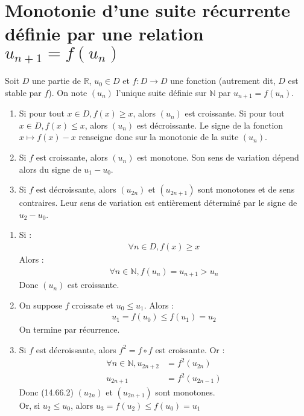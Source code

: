 \documentclass[../main.tex]{subfiles}
\begin{document}
\section{Monotonie d'une suite récurrente définie par une relation $u_{n+1} = f(u_n)$}
\begin{tcolorbox}[title=Théorème 14.66, title filled=false, colframe=orange, colback=orange!10!white]
    Soit $D$ une partie de $\mathbb{R}$, $u_0 \in D$ et $f:D\to D$ une fonction (autrement dit, $D$ est stable par $f$). On note $(u_n)$ l'unique suite définie sur $\mathbb{N}$ par $u_{n+1} = f(u_n)$. 
    \begin{enumerate}
        \item Si pour tout $x \in D, f(x) \geq x$, alors $(u_n)$ est croissante. Si pour tout $x \in D, f(x) \leq x$, alors $(u_n)$ est décroissante. Le signe de la fonction $x \mapsto f(x) - x$ renseigne donc sur la monotonie de la suite $(u_n)$. 
        \item Si $f$ est croissante, alors $(u_n)$ est monotone. Son sens de variation dépend alors du signe de $u_1 - u_0$. 
        \item Si $f$ est décroissante, alors $(u_{2n})$ et $(u_{2n+1})$ sont monotones et de sens contraires. Leur sens de variation est entièrement déterminé par le signe de $u_2 - u_0$. 
    \end{enumerate}
\end{tcolorbox}

\begin{enumerate}
    \item Si : 
    \begin{align*}
        \forall n \in D, f(x) \geq x
    \end{align*}
    Alors : 
    \begin{align*}
        \forall n \in \mathbb{N}, f(u_n) = u_{n+1} > u_n
    \end{align*}
    Donc $(u_n)$ est croissante. 

    \item On suppose $f$ croissate et $u_0 \leq u_1$. Alors : 
    \begin{align*}
        u_1 = f(u_0) \leq f(u_1) = u_2
    \end{align*}
    On termine par récurrence. 

    \item Si $f$ est décroissante, alors $f^2 = f \circ f$ est croissante. 
    Or : 
    \begin{align*}
        \forall n \in \mathbb{N}, u_{2n+2} &= f^2(u_{2n}) \\
        u_{2n+1} &= f^2(u_{2n-1})
    \end{align*}
    Donc (14.66.2) $(u_{2n})$ et $(u_{2n+1})$ sont monotones. \\
    Or, si $u_2 \leq u_0$, alors $u_3 = f(u_2) \leq f(u_0) = u_1$
\end{enumerate}
\end{document}
